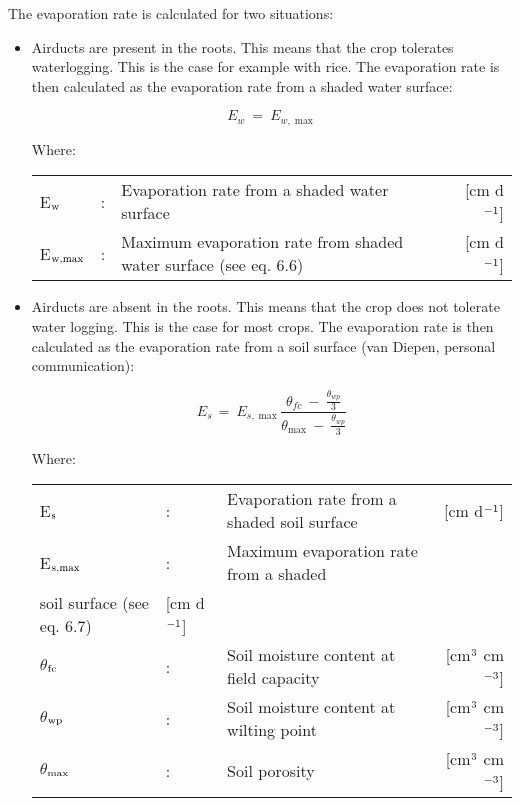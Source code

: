 The evaporation rate is calculated for two situations:
\begin{itemize}
\item Airducts are present in the roots. This means that the crop tolerates waterlog\-ging. This
is the case for example with rice. The evaporation rate is then calculated as the evapora\-tion rate from a shaded water surface:

\begin{equation}
E _{w} ~=~ E _{w, \max } 
\end{equation}

Where:\\
\begin{tabularx}{\textwidth}{llXr}
    E$_{{\rm w}}$ &:& Evaporation rate from a shaded water surface & [cm d$^{{\rm -1}}$]\\
    E$_{{\rm w,max}}$ &:& Maximum evaporation rate from shaded 
    water surface (see eq. 6.6) & [cm d$^{{\rm -1}}$]\\
\end{tabularx}

\item Airducts are absent in the roots. This means that the crop does not tolerate water
    logging. This is the case for most crops. The evaporation rate is then calculated as the
    evaporation rate from a soil surface (van Diepen, personal communication):  
    
    \begin{equation}
    E _{s~} =~ E _{s,\max } {\frac{ \theta  _{fc} ~-~ {{\frac{\theta  _{wp} }{3}}} }{\theta  _{\max } ~-~{{\frac{\theta  _{wp} }{3}}} }}
    \end{equation}
    
    Where:\\
    \begin{tabularx}{\textwidth}{llXr}
        E$_{{\rm s}}$ &:& Evaporation rate from a shaded soil surface & [cm d$^{{\rm -1}}$]\\
        E$_{{\rm s,max}}$ &:& Maximum evaporation rate from a shaded \\
        soil surface (see eq. 6.7) & [cm d$^{{\rm -1}}$]\\
        $\theta$$_{{\rm fc}}$ &:& Soil moisture content at field capacity & [cm$^{{\rm 3}}$ cm$^{{\rm -3}}$]\\
        $\theta$$_{{\rm wp}}$ &:& Soil moisture content at wilting point & [cm$^{{\rm 3}}$ cm$^{{\rm -3}}$]\\
        $\theta$$_{{\rm max}}$ &:& Soil porosity & [cm$^{{\rm 3}}$ cm$^{{\rm -3}}$]\\
    \end{tabularx}

\end{itemize}


